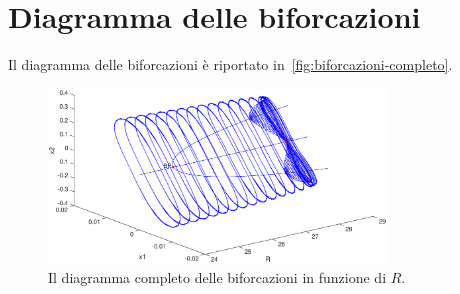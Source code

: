 \section{Diagramma delle biforcazioni}

Il diagramma delle biforcazioni è riportato in~\autoref{fig:biforcazioni-completo}.

\begin{figure}[h]
\centering
\includegraphics[width=0.8\textwidth]{matcont/BiforcazioniCompleto}
\caption{Il diagramma completo delle biforcazioni in funzione di $R$.}
\label{fig:biforcazioni-completo}
\end{figure}
